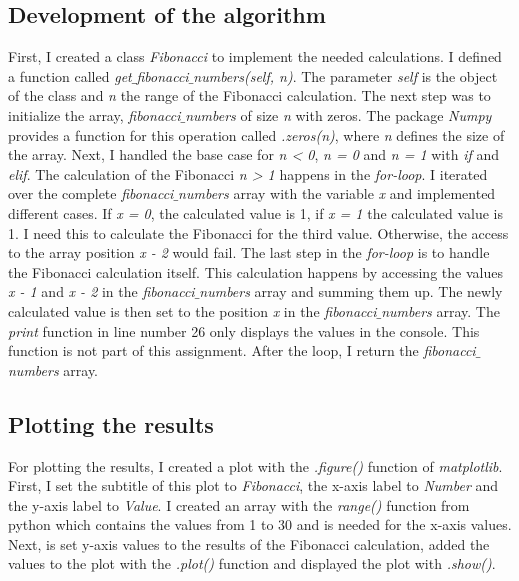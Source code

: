 \documentclass[10pt, a4paper, twocolumn]{article} %
\begin{document}
\subsection{Development of the algorithm}
First, I created a class \textit{Fibonacci} to implement the needed calculations. I defined a function called \textit{get$\_$fibonacci$\_$numbers(self, n)}. The parameter \textit{self} is the object of the class and \textit{n} the range of the Fibonacci calculation. The next step was to initialize the array, \textit{fibonacci$\_$numbers} of size \textit{n} with zeros. The package \textit{Numpy} provides a function for this operation called \textit{.zeros(n)}, where \textit{n} defines the size of the array. Next, I handled the base case for \textit{n < 0}, \textit{n = 0} and \textit{n = 1} with \textit{if} and \textit{elif}. The calculation of the Fibonacci \textit{n > 1} happens in the \textit{for-loop}. I iterated over the complete \textit{fibonacci$\_$numbers} array with the variable \textit{x} and implemented different cases. If \textit{x = 0}, the calculated value is 1, if \textit{x = 1} the calculated value is 1. I need this to calculate the Fibonacci for the third value. Otherwise, the access to the array position \textit{x - 2} would fail. The last step in the \textit{for-loop} is to handle the Fibonacci calculation itself. This calculation happens by accessing the values \textit{x - 1} and \textit{x - 2} in the \textit{fibonacci$\_$numbers} array and summing them up. The newly calculated value is then set to the position \textit{x} in the \textit{fibonacci$\_$numbers} array. The \textit{print} function in line number 26 only displays the values in the console. This function is not part of this assignment. After the loop, I return the \textit{fibonacci$\_$numbers} array.  

\subsection{Plotting the results}
For plotting the results, I created a plot with the \textit{.figure()} function of \textit{matplotlib}. First, I set the subtitle of this plot to \textit{Fibonacci}, the x-axis label to \textit{Number} and the y-axis label to \textit{Value}. I created an array with the \textit{range()} function from python which contains the values from 1 to 30 and is needed for the x-axis values. Next, is set y-axis values to the results of the Fibonacci calculation, added the values to the plot with the  \textit{.plot()} function and displayed the plot with \textit{.show()}.
\end{document}
